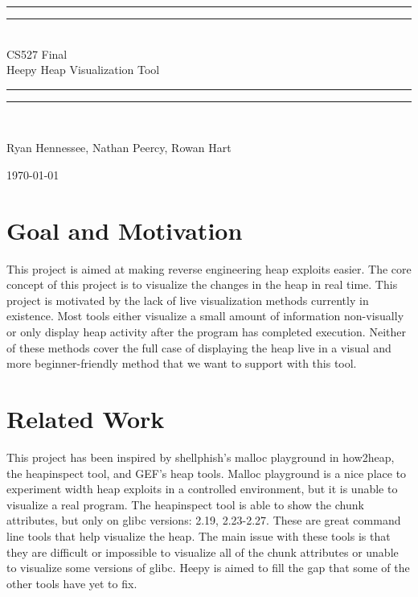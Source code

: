 \documentclass[12pt]{article}
\newlength{\drop}
\begin{document}
\begin{titlepage}
	\textheight
	\centering
	\vspace*{\baselineskip}
	\rule{\textwidth}{1.6pt}\vspace*{-\baselineskip}\vspace*{2pt}
	\rule{\textwidth}{0.4pt}\\[\baselineskip]
	{\LARGE CS527 Final \\[0.3\baselineskip] Heepy Heap Visualization Tool}\\[0.2\baselineskip]
	\rule{\textwidth}{0.4pt}\vspace*{-\baselineskip}\vspace{3.2pt}
	\rule{\textwidth}{1.6pt}\\[\baselineskip]
	\scshape
	\vspace*{2\baselineskip}
	{\Large Ryan Hennessee, Nathan Peercy, Rowan Hart\par}
	\vspace*{2\baselineskip}
	{\scshape \today} \\
	\vfill
\end{titlepage}

\section{Goal and Motivation}

This project is aimed at making reverse engineering heap exploits easier. The core concept of this project is to visualize the changes in the heap in real time. This project is motivated by the lack of live visualization methods currently in existence. Most tools either visualize a small amount of information non-visually or only display heap activity after the program has completed execution. Neither of these methods cover the full case of displaying the heap live in a visual and more beginner-friendly method that we want to support with this tool. \\

\section{Related Work}

This project has been inspired by shellphish’s malloc playground in how2heap, the heapinspect tool, and GEF’s heap tools. Malloc playground is a nice place to experiment width heap exploits in a controlled environment, but it is unable to visualize a real program. The heapinspect tool is able to show the chunk attributes, but only on glibc versions: 2.19, 2.23-2.27. These are great command line tools that help visualize the heap. The main issue with these tools is that they are difficult or impossible to visualize all of the chunk attributes or unable to visualize some versions of glibc. Heepy is aimed to fill the gap that some of the other tools have yet to fix.  \\
\end{document}
